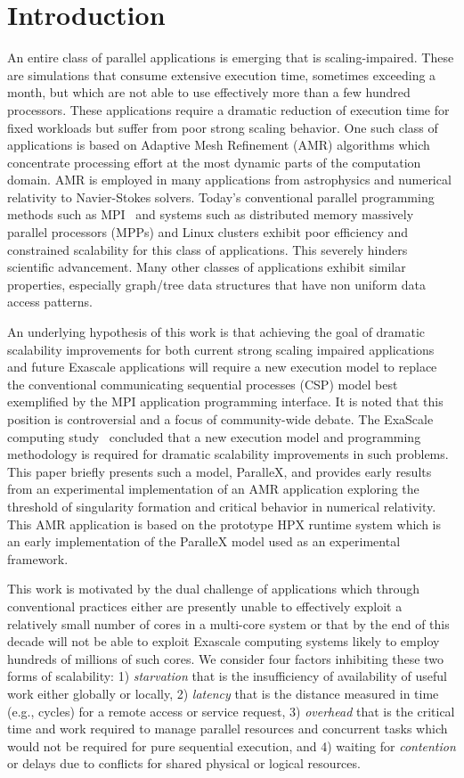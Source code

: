 \documentclass{revtex4}
\newcommand{\I}[1]{\textit{#1}}
\begin{document}
\section{Introduction}
An entire class of parallel applications is emerging that is
scaling-impaired. These are simulations that consume extensive
execution time, sometimes exceeding a month, but which are not able to
use effectively more than a few hundred processors.  These applications require a dramatic
reduction of execution time for fixed workloads but suffer from poor strong scaling behavior.
One such class of applications is based on Adaptive Mesh Refinement (AMR) algorithms which
 concentrate processing effort at the most dynamic parts of the computation domain. 
AMR is employed in many applications from astrophysics and numerical relativity to
Navier-Stokes solvers.  Today's conventional parallel programming methods such as 
MPI~\cite{MPISpec} and systems such as distributed memory massively parallel processors (MPPs) and Linux clusters 
exhibit poor efficiency and constrained scalability for this class of applications. 
 This severely hinders scientific advancement.  
Many other classes of applications exhibit similar properties, especially graph/tree 
data structures that have non uniform data access patterns.

An underlying hypothesis of this work is that achieving the goal of
dramatic scalability improvements for both current strong scaling impaired
applications and future Exascale applications will require a new execution model to
replace the conventional communicating sequential processes (CSP) model
best exemplified by the MPI application programming interface. It is
noted that this position is controversial and a focus of community-wide
debate.  The ExaScale computing study~\cite{ExaScale_study} concluded that a new execution model and 
programming methodology is required for dramatic scalability improvements in such problems.
This paper briefly presents such a model, ParalleX, and provides early results 
from an experimental implementation of an AMR application exploring the threshold of 
singularity formation and critical behavior in numerical relativity.  
This AMR application is based on the prototype HPX runtime system which is an early 
implementation of the ParalleX model used as an experimental framework.

This work is motivated by the dual challenge of
applications which through conventional practices either are presently
unable to effectively exploit a relatively small number of cores in a
multi-core system or that by the end of this decade will not be able to
exploit Exascale computing systems likely to employ hundreds of millions
of such cores. We consider four factors inhibiting
these two forms of scalability: 1) \I{starvation} that is the insufficiency
of availability of useful work either globally or locally, 2) \I{latency}
that is the distance measured in time (e.g., cycles) for a remote access
or service request, 3) \I{overhead} that is the critical time and work required
to manage parallel resources and concurrent tasks which would not be
required for pure sequential execution, and 4) waiting for \I{contention} or
delays due to conflicts for shared physical or logical resources. 
\end{document}
